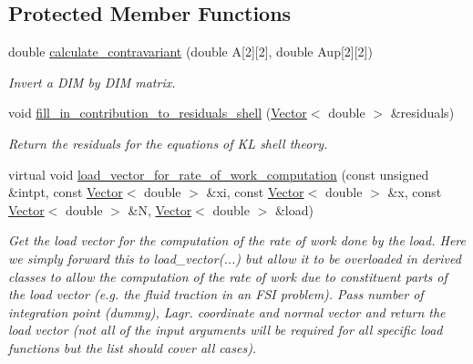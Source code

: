 \subsection*{Protected Member Functions}
\begin{DoxyCompactItemize}
\item 
double \hyperlink{classoomph_1_1KirchhoffLoveShellEquations_a6badfc9d15c8f6a8a66f663019e19cee}{calculate\+\_\+contravariant} (double A\mbox{[}2\mbox{]}\mbox{[}2\mbox{]}, double Aup\mbox{[}2\mbox{]}\mbox{[}2\mbox{]})
\begin{DoxyCompactList}\small\item\em Invert a D\+IM by D\+IM matrix. \end{DoxyCompactList}\item 
void \hyperlink{classoomph_1_1KirchhoffLoveShellEquations_a083c16732460cb430553239b9eaa1325}{fill\+\_\+in\+\_\+contribution\+\_\+to\+\_\+residuals\+\_\+shell} (\hyperlink{classoomph_1_1Vector}{Vector}$<$ double $>$ \&residuals)
\begin{DoxyCompactList}\small\item\em Return the residuals for the equations of KL shell theory. \end{DoxyCompactList}\item 
virtual void \hyperlink{classoomph_1_1KirchhoffLoveShellEquations_ae565dc5fcdf60d733f6d19361e88d22d}{load\+\_\+vector\+\_\+for\+\_\+rate\+\_\+of\+\_\+work\+\_\+computation} (const unsigned \&intpt, const \hyperlink{classoomph_1_1Vector}{Vector}$<$ double $>$ \&xi, const \hyperlink{classoomph_1_1Vector}{Vector}$<$ double $>$ \&x, const \hyperlink{classoomph_1_1Vector}{Vector}$<$ double $>$ \&N, \hyperlink{classoomph_1_1Vector}{Vector}$<$ double $>$ \&load)
\begin{DoxyCompactList}\small\item\em Get the load vector for the computation of the rate of work done by the load. Here we simply forward this to load\+\_\+vector(...) but allow it to be overloaded in derived classes to allow the computation of the rate of work due to constituent parts of the load vector (e.\+g. the fluid traction in an F\+SI problem). Pass number of integration point (dummy), Lagr. coordinate and normal vector and return the load vector (not all of the input arguments will be required for all specific load functions but the list should cover all cases). \end{DoxyCompactList}\end{DoxyCompactItemize}
